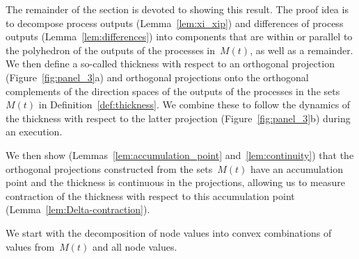 \documentclass[preprint,12pt,a4paper]{elsarticle}
\theoremstyle{plain}
\theoremstyle{definition}
\begin{document}
The remainder of the section is devoted to showing this result.
The proof idea is to decompose process outputs (Lemma~\ref{lem:xi_xip}) and differences of process outputs (Lemma~\ref{lem:differences}) into components that are within or parallel to the polyhedron of the outputs of the processes in~$M(t)$, as well as a remainder.
We then define a so-called thickness with respect to an orthogonal projection (Figure~\ref{fig:panel_3}a) and orthogonal projections onto the orthogonal complements of the direction spaces of the outputs of the processes in the sets~$M(t)$ in Definition~\ref{def:thickness}.
We combine these to follow the dynamics of the thickness with respect to the latter projection (Figure~\ref{fig:panel_3}b) during an execution.

We then show (Lemmas~\ref{lem:accumulation_point} and~\ref{lem:continuity}) that the orthogonal projections constructed from the sets~$M(t)$ have an accumulation point and the thickness is continuous in the projections, allowing us to measure contraction of the thickness with respect to this accumulation point (Lemma~\ref{lem:Delta-contraction}).

We start with the decomposition of node values into convex combinations of values from~$M(t)$
and all node values.
\end{document}
